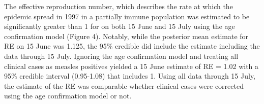 The effective reproduction number, which describes the rate at which the
epidemic spread in 1997 in a partially immune population was estimated
to be significantly greater than 1 for on both 15 June and 15 July using
the age confirmation model (Figure 4). Notably, while the posterior mean
estimate for RE on 15 June was 1.125, the 95\% credible did include the
estimate including the data through 15 July. Ignoring the age
confirmation model and treating all clinical cases as measles positives
yielded a 15 June estimate of RE = 1.02 with a 95\% credible interval
(0.95-1.08) that includes 1. Using all data through 15 July, the
estimate of the RE was comparable whether clinical cases were corrected
using the age confirmation model or not.